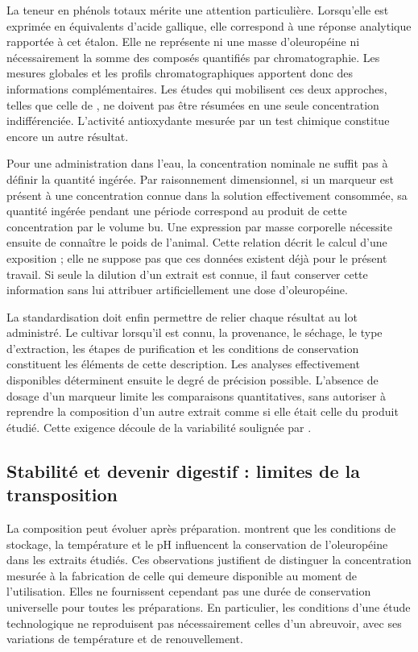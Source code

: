 La teneur en phénols totaux mérite une attention particulière. Lorsqu'elle est exprimée en équivalents d'acide gallique, elle correspond à une réponse analytique rapportée à cet étalon. Elle ne représente ni une masse d'oleuropéine ni nécessairement la somme des composés quantifiés par chromatographie. Les mesures globales et les profils chromatographiques apportent donc des informations complémentaires. Les études qui mobilisent ces deux approches, telles que celle de \citet{Koyuncu2026}, ne doivent pas être résumées en une seule concentration indifférenciée. L'activité antioxydante mesurée par un test chimique constitue encore un autre résultat.

Pour une administration dans l'eau, la concentration nominale ne suffit pas à définir la quantité ingérée. Par raisonnement dimensionnel, si un marqueur est présent à une concentration connue dans la solution effectivement consommée, sa quantité ingérée pendant une période correspond au produit de cette concentration par le volume bu. Une expression par masse corporelle nécessite ensuite de connaître le poids de l'animal. Cette relation décrit le calcul d'une exposition ; elle ne suppose pas que ces données existent déjà pour le présent travail. Si seule la dilution d'un extrait est connue, il faut conserver cette information sans lui attribuer artificiellement une dose d'oleuropéine.

La standardisation doit enfin permettre de relier chaque résultat au lot administré. Le cultivar lorsqu'il est connu, la provenance, le séchage, le type d'extraction, les étapes de purification et les conditions de conservation constituent les éléments de cette description. Les analyses effectivement disponibles déterminent ensuite le degré de précision possible. L'absence de dosage d'un marqueur limite les comparaisons quantitatives, sans autoriser à reprendre la composition d'un autre extrait comme si elle était celle du produit étudié. Cette exigence découle de la variabilité soulignée par \citet{Naseer2026}.

\subsection{Stabilité et devenir digestif : limites de la transposition}

La composition peut évoluer après préparation. \citet{Markhali2024} montrent que les conditions de stockage, la température et le pH influencent la conservation de l'oleuropéine dans les extraits étudiés. Ces observations justifient de distinguer la concentration mesurée à la fabrication de celle qui demeure disponible au moment de l'utilisation. Elles ne fournissent cependant pas une durée de conservation universelle pour toutes les préparations. En particulier, les conditions d'une étude technologique ne reproduisent pas nécessairement celles d'un abreuvoir, avec ses variations de température et de renouvellement.

